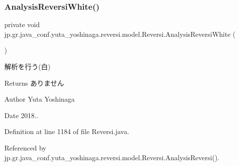 \mbox{\label{classjp_1_1gr_1_1java__conf_1_1yuta__yoshinaga_1_1reversi_1_1model_1_1_reversi_a519adbc5ec3bf5433fdb79bf8049cc75}} 
\subsubsection{\texorpdfstring{Analysis\+Reversi\+White()}{AnalysisReversiWhite()}}
{\footnotesize\ttfamily private void jp.\+gr.\+java\+\_\+conf.\+yuta\+\_\+yoshinaga.\+reversi.\+model.\+Reversi.\+Analysis\+Reversi\+White (\begin{DoxyParamCaption}{ }\end{DoxyParamCaption})\hspace{0.3cm}{\ttfamily [private]}}



解析を行う(白) 

\begin{DoxyReturn}{Returns}
ありません 
\end{DoxyReturn}
\begin{DoxyAuthor}{Author}
Yuta Yoshinaga 
\end{DoxyAuthor}
\begin{DoxyDate}{Date}
2018.. 
\end{DoxyDate}


Definition at line 1184 of file Reversi.\+java.



Referenced by jp.\+gr.\+java\+\_\+conf.\+yuta\+\_\+yoshinaga.\+reversi.\+model.\+Reversi.\+Analysis\+Reversi().

